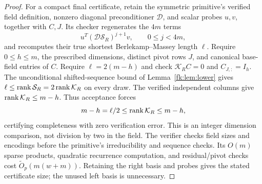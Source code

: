 \begin{proof}
For a compact final certificate, retain the symmetric primitive's
verified field definition, nonzero diagonal preconditioner $\mathcal D$,
and scalar probes $u,v$, together with $C,J$. Its checker regenerates
the $4m$ terms
\[
 u^T(\mathcal D\mathcal S_R)^{j+1}v,
 \qquad 0\le j<4m,
\]
and recomputes their true shortest Berlekamp--Massey length $\ell$.
Require $0\le h\le m$, the prescribed dimensions, distinct pivot
rows $J$, and canonical base-field entries of $C$. Require
$\ell=2(m-h)$ and check $\mathcal K_RC=0$ and $C_{J,:}=I_h$.
The unconditional shifted-sequence bound of Lemma~\ref{fk:lem:lower}
gives $\ell\le\operatorname{rank}\mathcal S_R=2\operatorname{rank}\mathcal K_R$ on every draw.
The verified independent columns give $\operatorname{rank}\mathcal K_R\le m-h$.
Thus acceptance forces
\[
 m-h=\ell/2\le\operatorname{rank}\mathcal K_R\le m-h,
\]
certifying completeness with zero verification error. This is an
integer dimension comparison, not division by two in the field.
The verifier checks field sizes and encodings before the primitive's
irreducibility and sequence checks. Its $O(m)$ sparse products,
quadratic recurrence computation, and residual/pivot checks cost
$\widetilde O_p(m(w+m))$. Retaining the right basis and probes gives
the stated certificate size; the unused left basis is unnecessary.
\end{proof}

